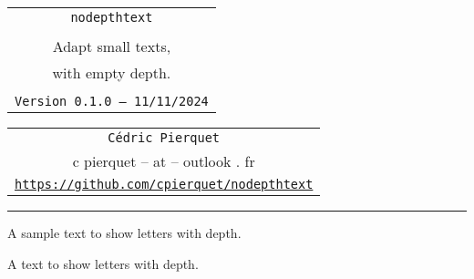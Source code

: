 \documentclass[11pt,a4paper]{ltxdoc}
\def\TPversion{0.1.0}
\def\TPdate{11/11/2024}
\begin{document}
\thispagestyle{empty}

\begin{center}
	\begin{minipage}{0.88\linewidth}
		\begin{tcolorbox}[colframe=yellow,colback=yellow!15]
			\begin{center}
				\renewcommand{\arraystretch}{1.25}%
				\begin{tabular}{c}
					{\Huge \texttt{nodepthtext}}\\
					\\
					{\LARGE Adapt small texts,} \\
					{\LARGE with empty depth.} \\
					\\
					{\small \texttt{Version \TPversion{} -- \TPdate}}
				\end{tabular}
			\end{center}
		\end{tcolorbox}
	\end{minipage}
\end{center}

\begin{center}
	\begin{tabular}{c}
		\texttt{Cédric Pierquet}\\
		{\ttfamily c pierquet -- at -- outlook . fr}\\
		\texttt{\url{https://github.com/cpierquet/nodepthtext}} \\
	\end{tabular}
\end{center}

\hrule

\vfill

\begin{tcolorbox}[colframe=lightgray,colback=lightgray!5]
A sample text to show letters with depth.\\
\end{tcolorbox}

\begin{tcolorbox}[colframe=lightgray,colback=lightgray!5]
{\LARGE\ttfamily A text to show letters with depth.}\\
{\LARGE\ttfamily{}}\\
{\LARGE\ttfamily{}}
\end{tcolorbox}
\end{document}
